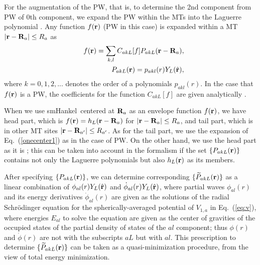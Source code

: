\documentclass[a4paper,10pt,aip,onecolumn,amsmath,amssymb,floatfix,rmp]{revtex4-1}
\newcommand{\bfr}{{\bf r}}
\newcommand{\hbfr}{\hat{\bf r}}
\newcommand{\bfR}{{\bf R}}
\def\phidot{\dot{\phi}}
\newcommand{\req}[1]{\mbox{Eq.~\!(\ref{#1})}}
\def\smh{smHankel}
\def\pakl{p_{akl}}
\def\PakL{P_{akL}}
\def\wPakL{\widetilde{P}_{akL}}
\def\CakL{C_{akL}}
\begin{document}
For the augmentation of the PW, that is, to determine the 2nd component
from PW of 0th component, we expand the PW within the MTs into the
Laguerre polynomial \cite{pmt1}.  Any function $f(\bfr)$ (PW in this
case) is expanded within a MT $|\bfr-\bfR_a|\leq R_a$ as
\begin{eqnarray}
&&f(\bfr)= \sum_{k,l} \CakL[f] \PakL(\bfr-\bfR_a), \label{onecenter1}\\
&&\PakL(\bfr)=\pakl(r) Y_L(\hbfr) \label{onecenter2},
\end{eqnarray}
where $k=0,1,2,...$ denotes the order of a polynomials $\pakl(r)$.  In
the case that $f(\bfr)$ is a PW, the coefficients for the function
$\CakL[f]$ are given analytically \cite{Bott98}.

When we use \smh\ centered at $\bfR_a$ as an envelope function
$f(\bfr)$, 
we have head part, which is $f(\bfr)=h_L(\bfr-\bfR_a)$ for
$|\bfr-\bfR_a| \leq R_a$, and tail part, which is in other MT
sites $|\bfr-\bfR_{a'}| \leq R_{a'}$.  As for the tail part, we use the
expansion of \req{onecenter1} as in the case of PW. On the other hand, we
use the head part as it is \cite{privatemark1};
this can be taken into account in the formalism 
if the set $\{\PakL(\bfr) \}$ contains not only the Laguerre
polynomials but also $h_L(\bfr)$ as its members.



After specifying $\{\PakL(\bfr) \}$, we can determine corresponding
$\{\wPakL(\bfr) \}$ as a linear combination of
$\phi_{al}(r)Y_L(\hat{\bfr})$ and $\phidot_{al}(r)Y_L(\hat{\bfr})$,
where partial waves $\phi_{al}(r)$ and its energy derivatives
$\phidot_{al}(r)$ are given as the solutions of the radial Schr\"odinger
equation for the spherically-averaged potential of $V_{1,a}$ in
\req{eq:v}, where energies $E_{al}$ to solve the equation are given as
the center of gravities of the occupied states of the partial density of
states of the $al$ component; thus 
$\phi(r)$ and $\phidot(r)$ are not with the subscripts $aL$ but with $al$.
This prescription to determine $\{\wPakL(\bfr) \}$ can be taken as a
quasi-minimization procedure, from the view of total energy
minimization.\\
\end{document}
